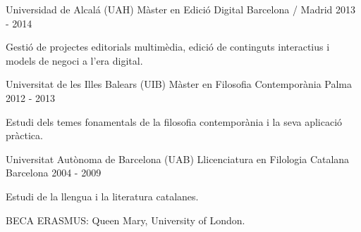 

\begin{cventries}

    
  \cventry
    {Universidad de Alcalá (UAH)} %
    {Màster en Edició Digital} %
    {Barcelona / Madrid} %
    {2013 - 2014} %
    {
      \begin{cvitems} %
        \item {Gestió de projectes editorials multimèdia, edició de continguts interactius i models de negoci a l'era digital.}
      \end{cvitems}
    }
    
  \cventry
    {Universitat de les Illes Balears (UIB)} %
    {Màster en Filosofia Contemporània} %
    {Palma} %
    {2012 - 2013} %
    {
      \begin{cvitems} %
        \item {Estudi dels temes fonamentals de la filosofia contemporània i la seva aplicació pràctica.}
      \end{cvitems}
    }
    
  \cventry
    {Universitat Autònoma de Barcelona (UAB)} %
    {Llicenciatura en Filologia Catalana} %
    {Barcelona} %
    {2004 - 2009} %
    {
      \begin{cvitems} %
        \item {Estudi de la llengua i la literatura catalanes.}
        \item {BECA ERASMUS: Queen Mary, University of London.}
      \end{cvitems}
    }

\end{cventries}
